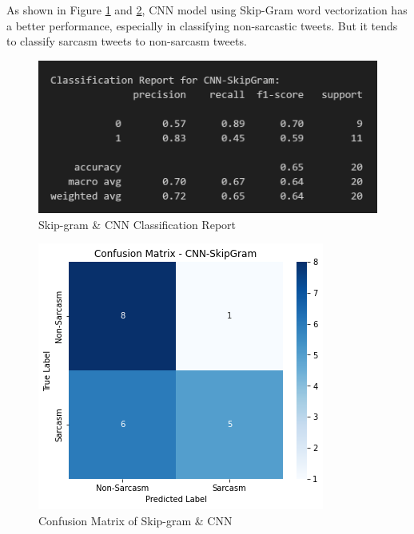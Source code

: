 \documentclass[11pt]{article}
\begin{document}
As shown in Figure \ref{fig:sgcnncr} and \ref{fig:sgcnncm}, CNN model using Skip-Gram word vectorization has a better performance, especially in classifying non-sarcastic tweets. But it tends to classify sarcasm tweets to non-sarcasm tweets.
\begin{figure}[htbp]
    \centering
    \includegraphics[width=.8\linewidth]{pic/CNN-Skipgram-Report.png}
    \caption{Skip-gram \& CNN Classification Report}
    \label{fig:sgcnncr}
\end{figure}
\begin{figure}[htbp]
    \centering
    \includegraphics[width=.8\linewidth]{pic/CNN-skipgram-Matrix.png}
    \caption{Confusion Matrix of Skip-gram \& CNN}
    \label{fig:sgcnncm}
\end{figure}
\end{document}
